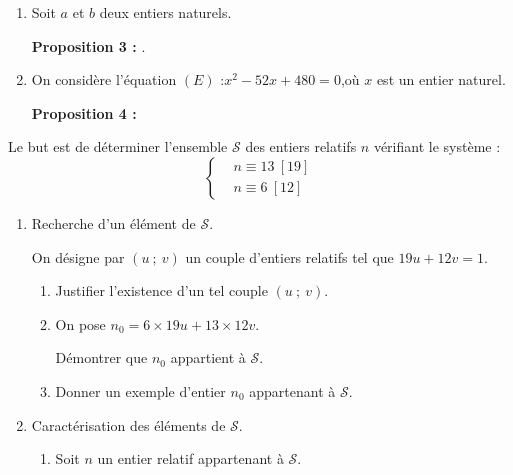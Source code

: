 \begin{colonne*exercice}
\begin{exercice}
\begin{enumerate}
\textbf{Proposition 2 : } 
\item Soit $a$ et $b$ deux entiers naturels.

\textbf{Proposition 3 : } .
\item On considère l'équation $(E)$ :\enskip $x^2 -52x +480= 0$,\enskip où $x$ est un entier naturel.

\textbf{Proposition 4 : } 
\end{enumerate}
\end{exercice}

\columnbreak


\begin{exercice}

Le but est de déterminer l'ensemble $\mathscr{S}$ des entiers relatifs $n$ vérifiant le système :\vspace{-5pt}
$$\left\{\begin{aligned}
				&n\equiv13\ [19]\\
				&n\equiv6\ [12]\end{aligned}\right.$$
\begin{enumerate}				
\item Recherche d'un élément de $\mathscr{S}$.

On désigne par $(u\ ;\ v)$ un couple d'entiers relatifs tel que $19u+12v=1$.
\begin{enumerate}
\item Justifier l'existence d'un tel couple $(u\ ;\ v)$.

\item On pose $n_0=6\times19u+13\times12v$.

Démontrer que $n_0$ appartient à $\mathscr{S}$.

\item Donner un exemple d'entier $n_0$ appartenant à $\mathscr{S}$.
\end{enumerate}

\item Caractérisation des éléments de $\mathscr{S}$.
\begin{enumerate}
\item Soit $n$ un entier relatif appartenant à $\mathscr{S}$.
 

\end{enumerate}
\end{enumerate}
\end{exercice}
\end{colonne*exercice}

